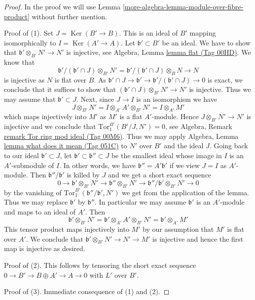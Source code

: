 \documentclass{amsart}
\theoremstyle{plain}
\theoremstyle{definition}
\theoremstyle{remark}
\numberwithin{equation}{subsection}
\def\Ker{\mathop{\mathrm{Ker}}}
\begin{document}
\begin{proof}
In the proof we will use Lemma \ref{more-algebra-lemma-module-over-fibre-product}
without further mention.

\medskip\noindent
Proof of (1). Set $J = \Ker(B' \to B)$. This is an ideal of $B'$
mapping isomorphically to $I = \Ker(A' \to A)$.
Let $\mathfrak b' \subset B'$ be an ideal.
We have to show that $\mathfrak b' \otimes_{B'} N' \to N'$
is injective, see Algebra, Lemma \href{https://stacks.math.columbia.edu/tag/00HD}{lemma flat (Tag 00HD)}.
We know that
$$
\mathfrak b'/(\mathfrak b' \cap J) \otimes_{B'} N' =
\mathfrak b'/(\mathfrak b' \cap J) \otimes_B N \to N
$$
is injective as $N$ is flat over $B$. As
$\mathfrak b' \cap J \to \mathfrak b' \to
\mathfrak b'/(\mathfrak b' \cap J) \to 0$ is exact, we
conclude that it suffices to show that
$(\mathfrak b' \cap J) \otimes_{B'} N' \to N'$
is injective. Thus we may assume that $\mathfrak b' \subset J$.
Next, since $J \to I$ is an isomorphism we have
$$
J \otimes_{B'} N' =
I \otimes_{A'} A' \otimes_{B'} N' =
I \otimes_{A'} M'
$$
which maps injectively into $M'$ as $M'$ is a flat $A'$-module.
Hence $J \otimes_{B'} N' \to N'$ is injective and we conclude
that $\text{Tor}_1^{B'}(B'/J, N') = 0$, see
Algebra, Remark \href{https://stacks.math.columbia.edu/tag/00M6}{remark Tor ring mod ideal (Tag 00M6)}.
Thus we may apply Algebra, Lemma \href{https://stacks.math.columbia.edu/tag/051C}{lemma what does it mean (Tag 051C)}
to $N'$ over $B'$ and the ideal $J$.
Going back to our ideal $\mathfrak b' \subset J$, let
$\mathfrak b' \subset \mathfrak b'' \subset J$ be the smallest ideal
whose image in $I$ is an $A'$-submodule of $I$. In other words,
we have $\mathfrak b'' = A' \mathfrak b'$ if we view $J = I$
as $A'$-module. Then $\mathfrak b''/\mathfrak b'$ is killed
by $J$ and we get a short exact sequence
$$
0 \to \mathfrak b' \otimes_{B'} N' \to
\mathfrak b'' \otimes_{B'} N' \to
\mathfrak b''/\mathfrak b' \otimes_{B'} N' \to 0
$$
by the vanishing of $\text{Tor}_1^{B'}(\mathfrak b''/\mathfrak b', N')$
we get from the application of the lemma.
Thus we may replace $\mathfrak b'$ by $\mathfrak b''$.
In particular we may assume $\mathfrak b'$ is an $A'$-module
and maps to an ideal of $A'$. Then
$$
\mathfrak b' \otimes_{B'} N' =
\mathfrak b' \otimes_{A'} A' \otimes_{B'} N' =
\mathfrak b' \otimes_{A'} M'
$$
This tensor product maps injectively into $M'$ by our assumption that
$M'$ is flat over $A'$. We conclude that
$\mathfrak b' \otimes_{B'} N' \to N' \to M'$ is injective
and hence the first map is injective as desired.

\medskip\noindent
Proof of (2). This follows by tensoring the short exact sequence
$0 \to B' \to B \oplus A' \to A \to 0$ with $L'$ over $B'$.

\medskip\noindent
Proof of (3). Immediate consequence of (1) and (2).
\end{proof}
\end{document}
